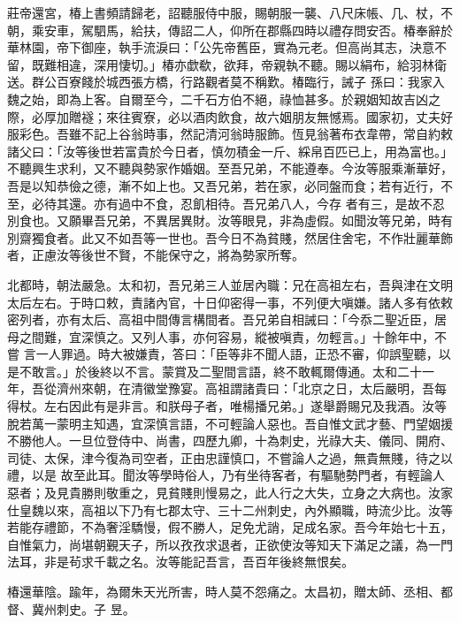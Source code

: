 \begin{pinyinscope}
 莊帝還宮，椿上書頻請歸老，詔聽服侍中服，賜朝服一襲、八尺床帳、几、杖，不朝，乘安車，駕駟馬，給扶，傳詔二人，仰所在郡縣四時以禮存問安否。椿奉辭於華林園，帝下御座，執手流淚曰：「公先帝舊臣，實為元老。但高尚其志，決意不留，既難相違，深用悽切。」椿亦歔欷，欲拜，帝親執不聽。賜以絹布，給羽林衛送。群公百寮餞於城西張方橋，行路觀者莫不稱歎。椿臨行，誡子
 孫曰：我家入魏之始，即為上客。自爾至今，二千石方伯不絕，祿恤甚多。於親姻知故吉凶之際，必厚加贈襚；來往賓寮，必以酒肉飲食，故六姻朋友無憾焉。國家初，丈夫好服彩色。吾雖不記上谷翁時事，然記清河翁時服飾。恆見翁著布衣韋帶，常自約敕諸父曰：「汝等後世若富貴於今日者，慎勿積金一斤、綵帛百匹已上，用為富也。」不聽興生求利，又不聽與勢家作婚姻。至吾兄弟，不能遵奉。今汝等服乘漸華好，吾是以知恭儉之德，漸不如上也。又吾兄弟，若在家，必同盤而食；若有近行，不至，必待其還。亦有過中不食，忍飢相待。吾兄弟八人，今存
 者有三，是故不忍別食也。又願畢吾兄弟，不異居異財。汝等眼見，非為虛假。如聞汝等兄弟，時有別齋獨食者。此又不如吾等一世也。吾今日不為貧賤，然居住舍宅，不作壯麗華飾者，正慮汝等後世不賢，不能保守之，將為勢家所奪。



 北都時，朝法嚴急。太和初，吾兄弟三人並居內職：兄在高祖左右，吾與津在文明太后左右。于時口敕，責諸內官，十日仰密得一事，不列便大嗔嫌。諸人多有依敕密列者，亦有太后、高祖中間傳言構間者。吾兄弟自相誡曰：「今忝二聖近臣，居母之間難，宜深慎之。又列人事，亦何容易，縱被嗔責，勿輕言。」十餘年中，不嘗
 言一人罪過。時大被嫌責，答曰：「臣等非不聞人語，正恐不審，仰誤聖聽，以是不敢言。」於後終以不言。蒙賞及二聖間言語，終不敢輒爾傳通。太和二十一年，吾從濟州來朝，在清徽堂豫宴。高祖謂諸貴曰：「北京之日，太后嚴明，吾每得杖。左右因此有是非言。和朕母子者，唯楊播兄弟。」遂舉爵賜兄及我酒。汝等脫若萬一蒙明主知遇，宜深慎言語，不可輕論人惡也。吾自惟文武才藝、門望姻援不勝他人。一旦位登侍中、尚書，四歷九卿，十為刺史，光祿大夫、儀同、開府、司徒、太保，津今復為司空者，正由忠謹慎口，不嘗論人之過，無貴無賤，待之以禮，以是
 故至此耳。聞汝等學時俗人，乃有坐待客者，有驅馳勢門者，有輕論人惡者；及見貴勝則敬重之，見貧賤則慢易之，此人行之大失，立身之大病也。汝家仕皇魏以來，高祖以下乃有七郡太守、三十二州刺史，內外顯職，時流少比。汝等若能存禮節，不為奢淫驕慢，假不勝人，足免尤誚，足成名家。吾今年始七十五，自惟氣力，尚堪朝覲天子，所以孜孜求退者，正欲使汝等知天下滿足之議，為一門法耳，非是茍求千載之名。汝等能記吾言，吾百年後終無恨矣。



 椿還華陰。踰年，為爾朱天光所害，時人莫不怨痛之。太昌初，贈太師、丞相、都督、冀州刺史。子
 昱。




\end{pinyinscope}
